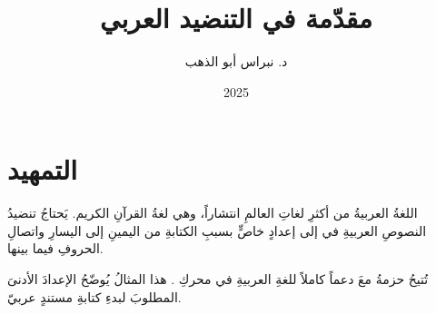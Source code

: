 \documentclass[12pt, a4paper]{article}
\begin{document}
\title{مقدّمة في التنضيد العربي}
\author{د. نبراس أبو الذهب}
\date{2025}
\maketitle

\section{التمهيد}

اللغةُ العربيةُ من أكثرِ لغاتِ العالمِ انتشاراً، وهي لغةُ القرآنِ الكريم.
يَحتاجُ تنضيدُ النصوصِ العربيةِ في  إلى إعدادٍ خاصٍّ بسببِ
الكتابةِ من اليمينِ إلى اليسارِ واتصالِ الحروفِ فيما بينها.

تُتيحُ حزمةُ  معَ  دعماً كاملاً للغةِ العربيةِ
في محركِ . هذا المثالُ يُوضّحُ الإعدادَ الأدنىَ المطلوبَ
لبدءِ كتابةِ مستندٍ عربيّ.
\end{document}

